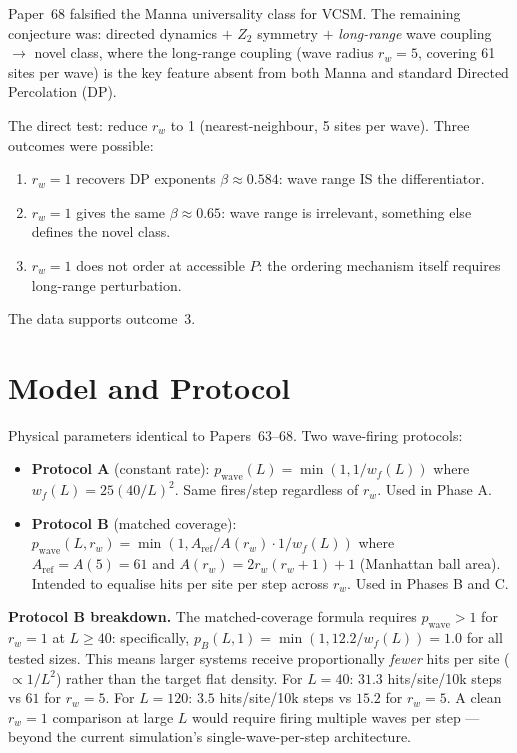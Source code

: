 \documentclass[twocolumn,10pt]{article}
\begin{document}
Paper~68 falsified the Manna universality class for VCSM.
The remaining conjecture was: directed dynamics $+$ $Z_2$ symmetry $+$
\emph{long-range} wave coupling $\to$ novel class, where the long-range
coupling (wave radius $r_w=5$, covering 61 sites per wave) is the key
feature absent from both Manna and standard Directed Percolation (DP).

The direct test: reduce $r_w$ to 1 (nearest-neighbour, 5 sites per wave).
Three outcomes were possible:
\begin{enumerate}
  \item $r_w=1$ recovers DP exponents $\beta\approx0.584$: wave range IS the differentiator.
  \item $r_w=1$ gives the same $\beta\approx0.65$: wave range is irrelevant, something
        else defines the novel class.
  \item $r_w=1$ does not order at accessible $P$: the ordering mechanism itself
        requires long-range perturbation.
\end{enumerate}
The data supports outcome~3.

\section{Model and Protocol}

Physical parameters identical to Papers~63--68.
Two wave-firing protocols:
\begin{itemize}
  \item \textbf{Protocol A} (constant rate): $p_\mathrm{wave}(L) =
        \min(1, 1/w_f(L))$ where $w_f(L) = 25(40/L)^2$.  Same fires/step
        regardless of $r_w$.  Used in Phase A.
  \item \textbf{Protocol B} (matched coverage): $p_\mathrm{wave}(L,r_w) =
        \min(1, A_\mathrm{ref}/A(r_w) \cdot 1/w_f(L))$ where
        $A_\mathrm{ref}=A(5)=61$ and $A(r_w)=2r_w(r_w+1)+1$ (Manhattan ball
        area).  Intended to equalise hits per site per step across $r_w$.
        Used in Phases B and C.
\end{itemize}

\textbf{Protocol B breakdown.}
The matched-coverage formula requires $p_\mathrm{wave}>1$ for $r_w=1$ at
$L\geq40$: specifically, $p_B(L,1) = \min(1, 12.2/w_f(L)) = 1.0$ for all
tested sizes.
This means larger systems receive proportionally \emph{fewer} hits per site
($\propto 1/L^2$) rather than the target flat density.
For $L=40$: $31.3$ hits/site/10k steps vs $61$ for $r_w=5$.
For $L=120$: $3.5$ hits/site/10k steps vs $15.2$ for $r_w=5$.
A clean $r_w=1$ comparison at large $L$ would require firing multiple waves
per step --- beyond the current simulation's single-wave-per-step architecture.
\end{document}
